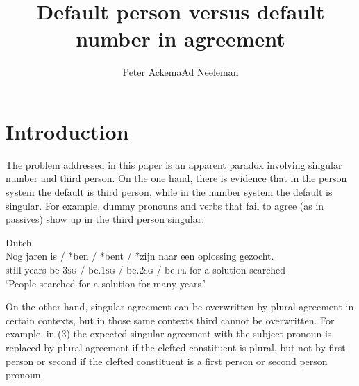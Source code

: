 \documentclass[output=paper]{langsci/langscibook}
\title{Default person versus default number in agreement}
\author{Peter Ackema\affiliation{University of Edinburgh}\lastand Ad Neeleman\affiliation{UCL}}
\begin{document}
 

 

 

 

 

\section{Introduction}

The problem addressed in this paper is an apparent paradox involving singular number and third person. On the one hand, there is evidence that in the person system the default is third person, while in the number system the default is singular. For example, dummy pronouns and verbs that fail to agree (as in  passives) show up in the third person singular:

\ea 
  \z
\z

\ea Dutch \\
\gll Nog  jaren  is / *ben / *bent / *zijn              naar een oplossing gezocht.\\
  still years  be-\textsc{3sg} / be.\textsc{1sg} / be.\textsc{2sg} / be.\textsc{pl} for   a    solution   searched\\
\glt ‘People searched for a solution for many years.’
\z

On the other hand, singular agreement can be overwritten by plural agreement in certain contexts, but in those same contexts third  cannot be overwritten. For example, in (3) the expected singular agreement with the subject pronoun is replaced by plural agreement if the clefted constituent is plural, but not by first person or second  if the clefted constituent is a first person or second person pronoun.
\end{document}
